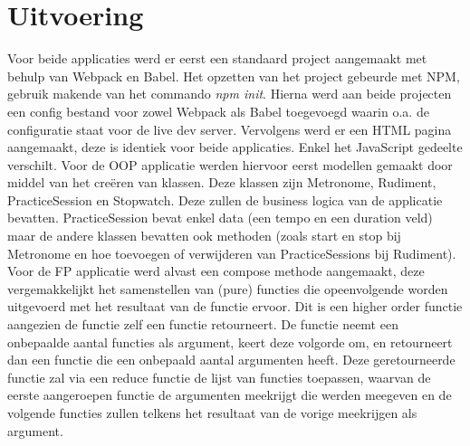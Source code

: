 \section{Uitvoering}
Voor beide applicaties werd er eerst een standaard project aangemaakt met behulp van Webpack en Babel. Het opzetten van het project gebeurde met NPM, gebruik makende van het commando \textit{npm init}. Hierna werd aan beide projecten een config bestand voor zowel Webpack als Babel toegevoegd waarin o.a. de configuratie staat voor de live dev server. Vervolgens werd er een HTML pagina aangemaakt, deze is identiek voor beide applicaties. Enkel het JavaScript gedeelte verschilt. Voor de OOP applicatie werden hiervoor eerst modellen gemaakt door middel van het creëren van klassen. Deze klassen zijn Metronome, Rudiment, PracticeSession en Stopwatch. Deze zullen de business logica van de applicatie bevatten. PracticeSession bevat enkel data (een tempo en een duration veld) maar de andere klassen bevatten ook methoden (zoals start en stop bij Metronome en hoe toevoegen of verwijderen van PracticeSessions bij Rudiment).
Voor de FP applicatie werd alvast een compose methode aangemaakt, deze vergemakkelijkt het samenstellen van (pure) functies die opeenvolgende worden uitgevoerd met het resultaat van de functie ervoor. Dit is een higher order functie aangezien de functie zelf een functie retourneert. De functie neemt een onbepaalde aantal functies als argument, keert deze volgorde om, en retourneert dan een functie die een onbepaald aantal argumenten heeft. Deze geretourneerde functie zal via een reduce functie de lijst van functies toepassen, waarvan de eerste aangeroepen functie de argumenten meekrijgt die werden meegeven en de volgende functies zullen telkens het resultaat van de vorige meekrijgen als argument.

